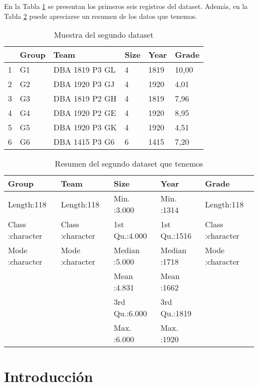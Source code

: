 \documentclass[10pt,a4paper]{article}
\begin{document}
En la Tabla \ref{table:6} se presentan los primeros seis registros del dataset. Además, en la Tabla \ref{table:7} puede apreciarse un resumen de los datos que tenemos.

\begin{table}[ht]
\centering
\begin{tabular}{rlllll}
  \hline
 & Group & Team & Size & Year & Grade \\ 
  \hline
1 & G1 & DBA 1819 P3 GL & 4 & 1819 & 10,00 \\ 
  2 & G2 & DBA 1920 P3 GJ & 4 & 1920 & 4,01 \\ 
  3 & G3 & DBA 1819 P2 GH & 4 & 1819 & 7,96 \\ 
  4 & G4 & DBA 1920 P2 GE & 4 & 1920 & 8,95 \\ 
  5 & G5 & DBA 1920 P3 GK & 4 & 1920 & 4,51 \\ 
  6 & G6 & DBA 1415 P3 G6 & 6 & 1415 & 7,20 \\ 
   \hline
\end{tabular}
\caption{Muestra del segundo dataset}
\label{table:6}
\end{table}

\begin{table}[ht]
\centering
\begin{tabular}{lllll}
  \hline
   Group &     Team &      Size &      Year &    Grade \\ 
  \hline
Length:118         & Length:118         & Min.   :3.000   & Min.   :1314   & Length:118         \\ 
  Class :character   & Class :character   & 1st Qu.:4.000   & 1st Qu.:1516   & Class :character   \\ 
  Mode  :character   & Mode  :character   & Median :5.000   & Median :1718   & Mode  :character   \\ 
   &  & Mean   :4.831   & Mean   :1662   &  \\ 
   &  & 3rd Qu.:6.000   & 3rd Qu.:1819   &  \\ 
   &  & Max.   :6.000   & Max.   :1920   &  \\ 
   \hline
\end{tabular}
\caption{Resumen del segundo dataset que tenemos}
\label{table:7}
\end{table}

\section{Introducción}
\end{document}
